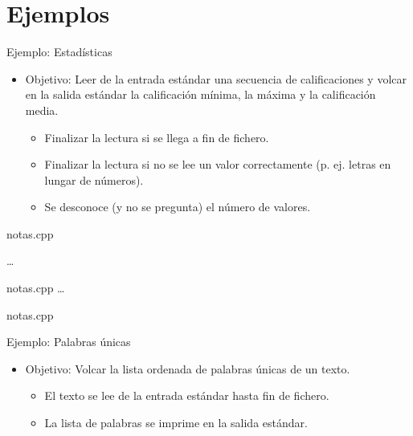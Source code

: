 \section{Ejemplos}

\begin{frame}[t]{Ejemplo: Estadísticas}
\begin{itemize}
  \item \alert{Objetivo}: Leer de la entrada estándar una secuencia de calificaciones
    y volcar en la salida estándar la calificación mínima, la máxima y la calificación media.
    \begin{itemize}
      \item Finalizar la lectura si se llega a fin de fichero.
      \item Finalizar la lectura si no se lee un valor correctamente (p. ej. letras en lungar de números).
      \item Se desconoce (y  no se pregunta) el número de valores.
    \end{itemize}
\end{itemize}
\end{frame}

 {

\begin{frame}
\begin{block}{notas.cpp}

\ldots
\end{block}
\end{frame}

\begin{frame}
\begin{block}{notas.cpp}
\ldots

\end{block}
\end{frame}

}

 {
\begin{frame}
\begin{block}{notas.cpp}

\end{block}
\end{frame}
}

\begin{frame}[t]{Ejemplo: Palabras únicas}
\begin{itemize}
  \item \alert{Objetivo}: Volcar la lista ordenada de palabras únicas de un texto.
    \begin{itemize}
      \item El texto se lee de la entrada estándar hasta fin de fichero.
      \item La lista de palabras se imprime en la salida estándar.
    \end{itemize}
\end{itemize}
\end{frame}


